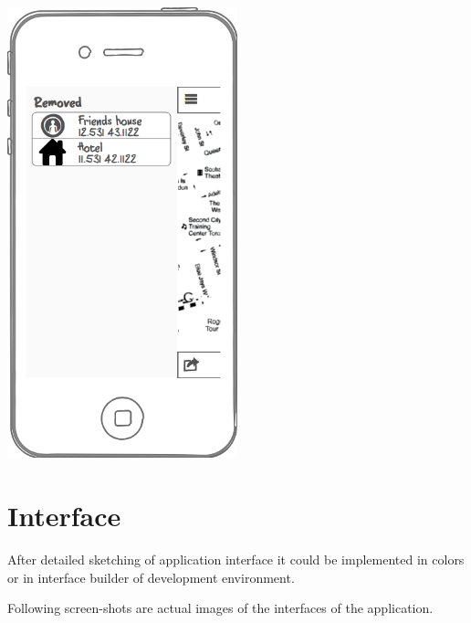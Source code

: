 \documentclass[thesis=M,english]{FITthesis}[2012/10/20]
\begin{document}
\begin{center}
\includegraphics[width=0.5\textwidth]{images/wireframes/removed_places}

\end{center}

\section{Interface}

After detailed sketching of application interface it could be implemented in colors or in interface builder of development environment.

Following screen-shots are actual images of the interfaces of the application.

\clearpage
\end{document}
